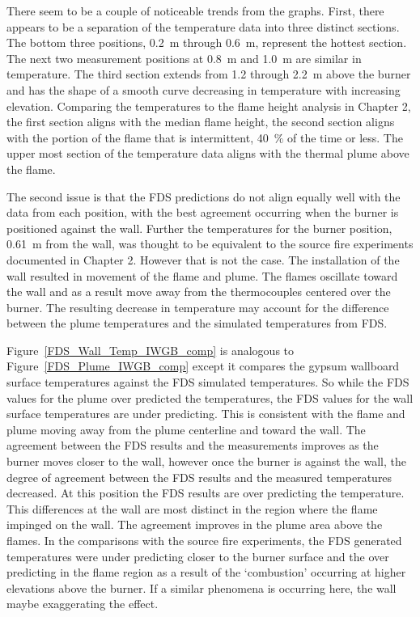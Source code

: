 \documentclass[twoside]{uocthesis}
\begin{document}
{ There seem to be a couple of noticeable trends from the graphs.  First, there appears to be a separation of the temperature data into three distinct sections.  The bottom three positions, 0.2~m through 0.6~m, represent the hottest section.  The next two measurement positions at 0.8~m and 1.0~m are similar in temperature.  The third section extends from 1.2 through 2.2~m above the burner and has the shape of a smooth curve decreasing in temperature with increasing elevation.  Comparing the temperatures to the flame height analysis in Chapter 2, the first section aligns with the median flame height, the second section aligns with the portion of the flame that is intermittent, 40~$\%$ of the time or less.  The upper most section of the temperature data aligns with the thermal plume above the flame.  

 The second issue is that the FDS predictions do not align equally well with the data from each position, with the best agreement occurring when the burner is positioned against the wall.  Further the temperatures for the burner position, 0.61~m from the wall, was thought to be equivalent to the source fire experiments documented in Chapter 2. However that is not the case.  The installation of the wall resulted in movement of the flame and plume.  The flames oscillate toward the wall and as a result move away from the thermocouples centered over the burner. The resulting decrease in temperature may account for the difference between the plume temperatures and the simulated temperatures from FDS.                     

Figure~\ref{FDS_Wall_Temp_IWGB_comp} is analogous to Figure~\ref{FDS_Plume_IWGB_comp} except it compares the gypsum wallboard surface temperatures against the FDS simulated temperatures.  So while the FDS values for the plume over predicted the temperatures, the FDS values for the wall surface temperatures are under predicting.  This is consistent with the flame and plume moving away from the plume centerline and toward the wall.  The agreement between the FDS results and the measurements improves as the burner moves closer to the wall, however once the burner is against the wall, the degree of agreement between the FDS results and the measured temperatures decreased.  At this position the FDS results are over predicting the temperature. This differences at the wall are most distinct in the region where the flame impinged on the wall.  The agreement improves in the plume area above the flames.  In the comparisons with the source fire experiments, the FDS generated temperatures were under predicting closer to the burner surface and the over predicting in the flame region as a result of the `combustion' occurring at higher elevations above the burner.  If a similar phenomena is occurring here, the wall maybe exaggerating the effect.      

}
\end{document}
